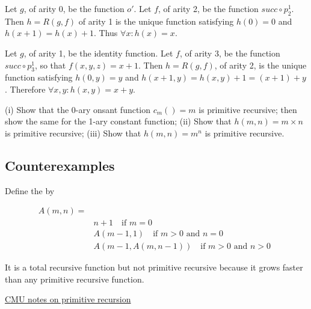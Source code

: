  Let $g$, of arity 0, be the function $o'$. Let $f$, of arity 2, be the function $succ \circ p^1_2$.  Then $h = R(g,f)$ of arity 1 is the unique function satisfying $h(0) = 0$ and $h(x+1) = h(x) + 1$.  Thus $\forall x: h(x) = x$.

 Let $g$, of arity 1,  be the identity function.   Let $f$, of arity 3, be the function $succ \circ p^1_3$, so that $f(x,y,z) = x + 1$.  Then $h = R(g,f)$, of arity 2, is the unique function satisfying $h(0,y) = y$ and $h(x+1,y) = h(x,y) + 1 = (x+1) + y$.  Therefore $\forall x,y: h(x,y) = x + y$.

 (i) Show that the 0-ary onsant function $c_m() = m$ is primitive recursive; then show the same for the 1-ary constant function; (ii) Show that $h(m,n) = m\times n$ is primitive recursive; (iii) Show that $h(m,n) = m^n$ is primitive recursive.


\subsection{Counterexamples}

Define the  by


\begin{align}
A(m,n)  =& \\
               & n+ 1 \quad  \text{if $m = 0$} \\
              & A(m-1,1)  \quad \text{if $m > 0$ and $n = 0$} \\
              & A(m-1,A(m,n-1)) \quad \text{if $m > 0$ and $n > 0$} \ \ 
\end{align}

It is a total recursive function but not primitive recursive because it grows faster than any primitive recursive function.


\href{https://www.andrew.cmu.edu/user/kk3n/complearn/chapter2.pdf}{CMU notes on primitive recursion}
